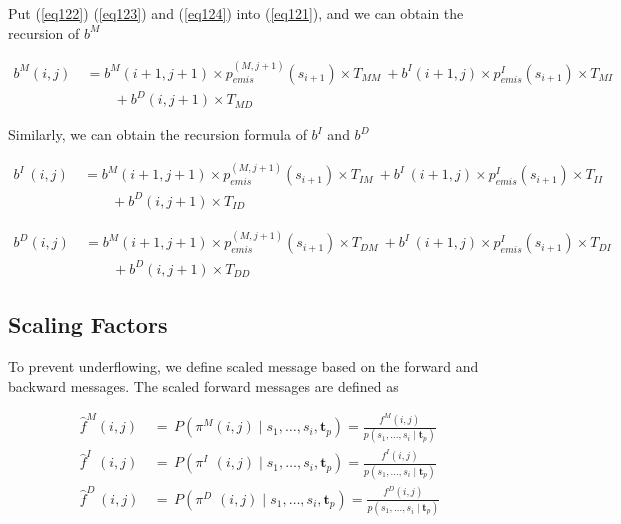 \documentclass[10pt]{article}
\begin{document}
    Put (\ref{eq122}) (\ref{eq123}) and (\ref{eq124}) into (\ref{eq121}), and we can obtain the recursion of $b^{M}$

    \begin{equation} \label{eq125}
    \begin{aligned}
      b^M(i, j) \
        &= b^M(i+1, j+1) \times p_{emis}^{(M, j+1)}(s_{i+1}) \times T_{MM} \
          + b^{I}(i+1, j) \times p_{emis}^{I}(s_{i+1}) \times T_{MI} \\
          &\qquad+ b^{D}(i, j+1) \times T_{MD}
    \end{aligned}
    \end{equation}

    Similarly, we can obtain the recursion formula of $b^{I}$ and $b^{D\;}$

    \begin{equation} \label{eq126}
    \begin{aligned}
      b^{I\;}(i, j) \
        &= b^M(i+1, j+1) \times p_{emis}^{(M, j+1)}(s_{i+1}) \times T_{IM} \
          + b^{I\;}(i+1, j) \times p_{emis}^{I}(s_{i+1}) \times T_{II} \\
          &\qquad+ b^{D}(i, j+1) \times T_{ID}
    \end{aligned}
    \end{equation}

    \begin{equation}  \label{eq12}
    \begin{aligned}
      b^{D}(i, j) \
        &= b^M(i+1, j+1) \times p_{emis}^{(M, j+1)}(s_{i+1}) \times T_{DM} \
          + b^{I\;}(i+1, j) \times p_{emis}^{I}(s_{i+1}) \times T_{DI} \\
          &\qquad+ b^{D}(i, j+1) \times T_{DD}
    \end{aligned}
    \end{equation}

  \subsection{Scaling Factors}

    To prevent underflowing, we define scaled message based on the forward and backward messages. The scaled forward messages are defined as

    \begin{equation}
    \begin{aligned}
      \widehat{f}^{M}(i, j) \,&=\, P(\pi^M(i, j) \;|\; s_1, \dots,s_{i}, \mathbf{t}_{p}) = \frac{f^{M}(i, j)}{p(s_1, \dots,s_{i} \;|\; \mathbf{t}_{p})} \\
      \widehat{f}^{I\;\;}(i, j) \,&=\, P(\pi^{I\;\;}(i, j) \;|\; s_1, \dots,s_{i}, \mathbf{t}_{p}) = \frac{f^{I}(i, j)}{p(s_1, \dots,s_{i} \;|\; \mathbf{t}_{p})}\\
      \widehat{f}^{D\;}(i, j) \,&=\, P(\pi^{D\;}\,(i, j) \;|\; s_1, \dots,s_{i}, \mathbf{t}_{p}) = \frac{f^{D}(i, j)}{p(s_1, \dots,s_{i} \;|\; \mathbf{t}_{p})}
    \end{aligned}
    \end{equation}
\end{document}
